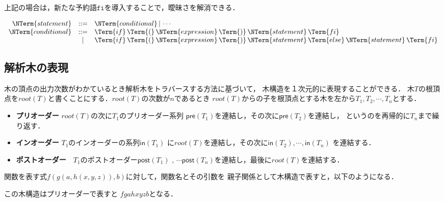 \documentclass[a4j,dvipdfmx]{jbook}
\begin{document}
上記の場合は，新たな予約語$\mathtt{fi}$を導入することで，曖昧さを解消できる．

\[\begin{array}{rcl}
  \NTerm{statement} & \mathtt{::=} & \NTerm{conditional}\,|\, \cdots\\
  \NTerm{conditional} & \mathtt{::=} & \Term{if}\,\Term{(}\,\NTerm{expression}\,\Term{)}\,\NTerm{statement}\,\Term{fi}\\
  & | & \Term{if}\,\Term{(}\,\NTerm{expression}\,\Term{)}\,\NTerm{statement}\,\Term{else}\,\NTerm{statement}\,\Term{fi}
\end{array}\]

\subsection{解析木の表現}

木の頂点の出力次数がわかているとき解析木をトラバースする方法に基づいて，
木構造を１次元的に表現することができる．
木$T$の根頂点を$root(T)$と書くことにする．$root(T)$の次数が$n$であるとき
$root(T)$からの子を根頂点とする木を左から$T_1,T_2,\cdots,T_n$とする．

\begin{itemize}
  \item {\bf プリオーダー} $root(T)$の次に$T_1$のプリオーダー系列
  $\mathsf{pre}(T_1)$を連結し，その次に$\mathsf{pre}(T_2)$を連結し，
  というのを再帰的に$T_n$まで繰り返す．
  \item {\bf インオーダー} $T_1$のインオーダーの系列$\mathsf{in}(T_1)$
  に$root(T)$を連結し，その次に$\mathsf{in}(T_2), \cdots, \mathsf{in}(T_n)$
  を連結する．
  \item {\bf ポストオーダー}　$T_1$のポストオーダー$\mathsf{post}(T_1)$
  , $\cdots \mathsf{post}(T_n)$を連結し，最後に$root(T)$を連結する．
\end{itemize}

関数を表す式$f(g(a,h(x,y,z)),b)$に対して，関数名とその引数を
親子関係として木構造で表すと，以下のようになる．
\begin{center}
\end{center}
この木構造はプリオーダーで表すと $fgahxyzb$となる．
\end{document}
